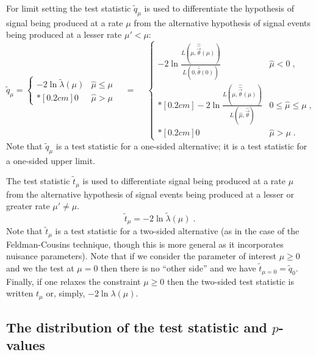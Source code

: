 For limit setting the test statistic $\tilde{q}_{\mu}$ is used to differentiate the hypothesis of signal being produced at a rate $\mu$ from the alternative hypothesis of signal events being produced at a lesser rate $\mu'<\mu$:
\begin{equation}
\label{eqn:qmutilde}  
\tilde{q}_{\mu} =  \left\{ \!
\! \begin{array}{ll} - 2 \ln \tilde{\lambda}(\mu)  & \hat{\mu} \le \mu
\\*[0.2 cm] 0 & \hat{\mu} > \mu 
              \end{array} \right.  \quad = \quad \: \left\{ \!
\! \begin{array}{lll} - 2 \ln \frac{L(\mu,
\hat{\hat{\vec{\theta}}}(\mu))} {L(0, \hat{\hat{\theta}}(0))}   &
\hat{\mu} < 0 \;, \\*[0.2 cm] -2 \ln \frac{L(\mu,
\hat{\hat{\vec{\theta}}}(\mu))} {L(\hat{\mu}, \hat{\vec{\theta}})} &
0 \le \hat{\mu} \le \mu  \;, \\*[0.2 cm] 0 & \hat{\mu} > \mu \;.
              \end{array} \right.
\end{equation}
Note that $\tilde{q}_{\mu}$ is a test statistic for a one-sided alternative; it is a test statistic for a one-sided upper limit. 


The test statistic $\tilde{t}_\mu$ is used to differentiate signal being produced at a rate $\mu$ from the alternative hypothesis of signal events being produced at a lesser or greater rate $\mu' \ne\mu$.
\begin{equation}
\label{eqn:tmu}
\tilde{t}_{\mu} =  - 2 \ln \tilde{\lambda}(\mu)   \; .  
\end{equation}
Note that $\tilde{t}_\mu$ is a test statistic for a two-sided alternative (as in the case of the Feldman-Cousins technique, though this is more general as it incorporates nuisance parameters).  Note  that if we consider the parameter of interest $\mu\ge 0$ and we the test at $\mu=0$ then there is no ``other side'' and we have $\tilde{t}_{\mu=0} = \tilde{q}_0$.  Finally, if one relaxes the constraint $\mu\ge0$ then the two-sided test statistic is written $t_\mu$ or, simply, $-2\ln\lambda(\mu)$.


\subsection{The distribution of the test statistic and $p$-values}


